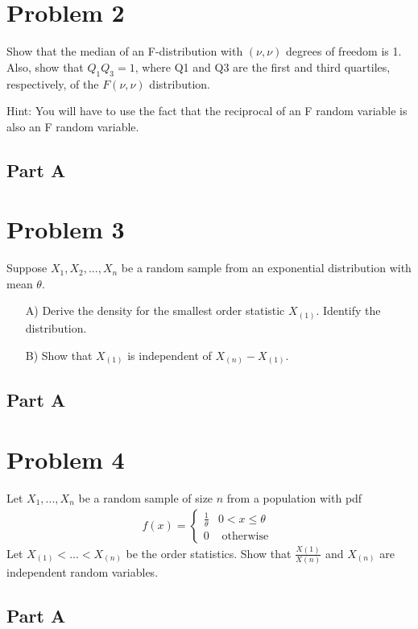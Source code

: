 \documentclass{article}
\begin{document}
\clearpage

\section*{Problem 2}
 Show that the median of an F-distribution with $(\nu, \nu)$ degrees of freedom is 1. Also,
show that $Q_1Q_3 = 1$, where Q1 and Q3 are the first and third quartiles, respectively, of the $F(\nu,\nu)$
distribution.

Hint: You will have to use the fact that the reciprocal of an F random variable is also an F random
variable.

\subsection*{Part A}

    
\clearpage
\section*{Problem 3}
Suppose $X_1,X_2,...,X_n$ be a random sample from an exponential distribution with mean $\theta$.
\begin{enumerate}
\item[A)] Derive the density for the smallest order statistic $X_{(1)}$. Identify the distribution.
\item[B)] Show that $X_{(1)}$ is independent of $X_{(n)}-X_{(1)}$.
\end{enumerate}
\subsection*{Part A}
   
\clearpage
\section*{Problem 4}
 Let $X_1,...,X_n$ be a random sample of size $n$ from a population with pdf
 \begin{align*}
 f(x) = \begin{cases} 
      \frac{1}{\theta} & 0<x\leq \theta \\
       0 & \text{ otherwise } 
   \end{cases}
\end{align*}
Let $X_{(1)}<...< X_{(n)}$ be the order statistics. Show that $\frac{X(1)}{X(n)}$ and $X_{(n)}$ are independent
random variables.

\subsection*{Part A}
\end{document}
